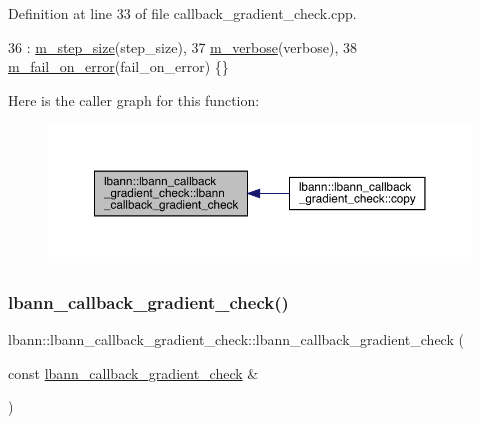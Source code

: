 Definition at line 33 of file callback\+\_\+gradient\+\_\+check.\+cpp.


\begin{DoxyCode}
36   : \hyperlink{classlbann_1_1lbann__callback__gradient__check_ab324dbfc7d21b69f135d33ee8290c4b2}{m\_step\_size}(step\_size),
37     \hyperlink{classlbann_1_1lbann__callback__gradient__check_a9a8669004ccfc3b76963ba13252600d3}{m\_verbose}(verbose),
38     \hyperlink{classlbann_1_1lbann__callback__gradient__check_ac05a23972812866458fff241de0bb324}{m\_fail\_on\_error}(fail\_on\_error) \{\}
\end{DoxyCode}
Here is the caller graph for this function\+:\nopagebreak
\begin{figure}[H]
\begin{center}
\leavevmode
\includegraphics[width=350pt]{classlbann_1_1lbann__callback__gradient__check_ae198159c613bb05e00f49b824a61afbb_icgraph}
\end{center}
\end{figure}
\mbox{\label{classlbann_1_1lbann__callback__gradient__check_accd5a7f087c5bf782f17b428cfb75bdb}} 
\subsubsection{\texorpdfstring{lbann\+\_\+callback\+\_\+gradient\+\_\+check()}{lbann\_callback\_gradient\_check()}\hspace{0.1cm}{\footnotesize\ttfamily [2/2]}}
{\footnotesize\ttfamily lbann\+::lbann\+\_\+callback\+\_\+gradient\+\_\+check\+::lbann\+\_\+callback\+\_\+gradient\+\_\+check (\begin{DoxyParamCaption}\item[{const \hyperlink{classlbann_1_1lbann__callback__gradient__check}{lbann\+\_\+callback\+\_\+gradient\+\_\+check} \&}]{ }\end{DoxyParamCaption})\hspace{0.3cm}{\ttfamily [default]}}



